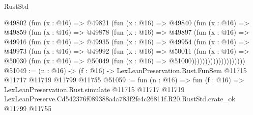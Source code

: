 \begin{lexlean}{RustStd}
\begin{coremodule}
              @49802
                (fun (x : @16) =>
                @49821
                  (fun (x : @16) =>
                  @49840
                    (fun (x : @16) =>
                    @49859
                      (fun (x : @16) =>
                      @49878
                        (fun (x : @16) =>
                        @49897
                          (fun (x : @16) =>
                          @49916
                            (fun (x : @16) =>
                            @49935
                              (fun (x : @16) =>
                              @49954
                                (fun (x : @16) =>
                                @49973
                                  (fun (x : @16) =>
                                  @49992
                                    (fun (x : @16) =>
                                    @50011
                                      (fun (x : @16) =>
                                      @50030
                                        (fun (x : @16) =>
                                        @50049 (fun (x : @16) => @51000))))))))))))))))))))
@51049 := (n : @16) ->
  (f : @16) -> LexLeanPreservation.Rust.FunSem @11715 @11717 @11719 @11799 @11755
@51059 := fun (n : @16) =>
  fun (f : @16) =>
  LexLeanPreservation.Rust.simulate
    @11715
    @11717
    @11719
    LexLeanPreserve.Cd542376f089388a4a783f2fc4c26811f.R20.RustStd.crate_ok
    @11799
    @11755
\end{coremodule}
\end{lexlean}
